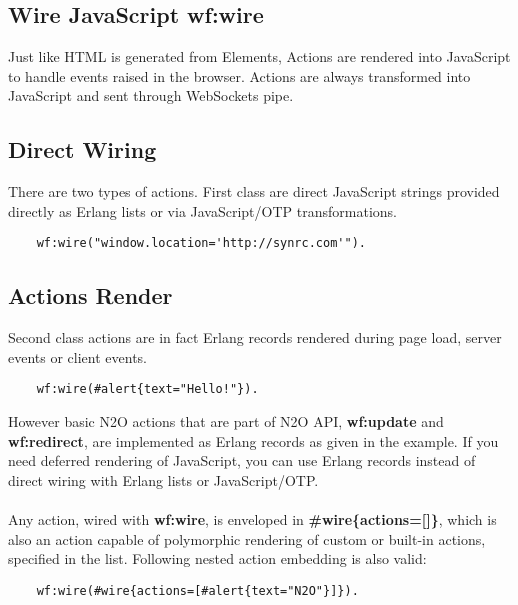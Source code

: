 \newpage
\subsection{Wire JavaScript \bf{wf:wire}}
Just like HTML is generated from Elements, Actions are rendered into
JavaScript to handle events raised in the browser. Actions are always
transformed into JavaScript and sent through WebSockets pipe.

\subsection*{Direct Wiring}
There are two types of actions. First class are direct JavaScript
strings provided directly as Erlang lists or via JavaScript/OTP
transformations.

\vspace{1\baselineskip}
\begin{lstlisting}
    wf:wire("window.location='http://synrc.com'").
\end{lstlisting}

\subsection*{Actions Render}
Second class actions are in fact Erlang records
rendered during page load, server events or client events.

\vspace{1\baselineskip}
\begin{lstlisting}
    wf:wire(#alert{text="Hello!"}).
\end{lstlisting}
\vspace{1\baselineskip}

However basic N2O actions that are part of N2O API, {\bf wf:update} and {\bf wf:redirect},
are implemented as Erlang records as given in the example. If you need deferred
rendering of JavaScript, you can use Erlang records instead of direct wiring with
Erlang lists or JavaScript/OTP.

\paragraph{}
Any action, wired with {\bf wf:wire}, is enveloped in {\bf \#wire\{actions=[]\}},
which is also an action capable of polymorphic rendering of custom or built-in actions, specified in the list.
Following nested action embedding is also valid:

\vspace{1\baselineskip}
\begin{lstlisting}
    wf:wire(#wire{actions=[#alert{text="N2O"}]}).
\end{lstlisting}
\vspace{1\baselineskip}

